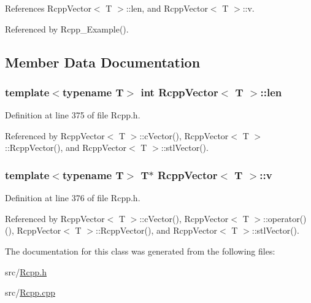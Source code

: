 References RcppVector$<$ T $>$::len, and RcppVector$<$ T $>$::v.

Referenced by Rcpp\_\-Example().

\subsection{Member Data Documentation}
\hypertarget{classRcppVector_733f5ed23ade0723338904f9f08457d6}{
\subsubsection[{len}]{\setlength{\rightskip}{0pt plus 5cm}template$<$typename T$>$ int {\bf RcppVector}$<$ T $>$::{\bf len}}}
\label{classRcppVector_733f5ed23ade0723338904f9f08457d6}




Definition at line 375 of file Rcpp.h.

Referenced by RcppVector$<$ T $>$::cVector(), RcppVector$<$ T $>$::RcppVector(), and RcppVector$<$ T $>$::stlVector().\hypertarget{classRcppVector_c810c53db4c1b978bada104b38484b26}{
\subsubsection[{v}]{\setlength{\rightskip}{0pt plus 5cm}template$<$typename T$>$ T$\ast$ {\bf RcppVector}$<$ T $>$::{\bf v}}}
\label{classRcppVector_c810c53db4c1b978bada104b38484b26}




Definition at line 376 of file Rcpp.h.

Referenced by RcppVector$<$ T $>$::cVector(), RcppVector$<$ T $>$::operator()(), RcppVector$<$ T $>$::RcppVector(), and RcppVector$<$ T $>$::stlVector().

The documentation for this class was generated from the following files:\begin{CompactItemize}
\item 
src/\hyperlink{Rcpp_8h}{Rcpp.h}\item 
src/\hyperlink{Rcpp_8cpp}{Rcpp.cpp}\end{CompactItemize}
